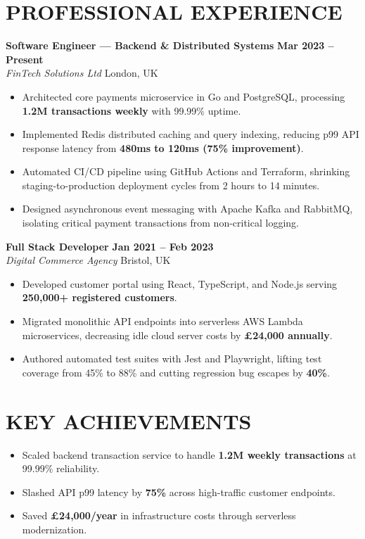 \documentclass[11pt,a4paper]{article}
\begin{document}
\section*{PROFESSIONAL EXPERIENCE}

\textbf{Software Engineer --- Backend \& Distributed Systems} \hfill \textbf{Mar 2023 -- Present} \\
\textit{FinTech Solutions Ltd} \hfill London, UK
\begin{itemize}
    \item Architected core payments microservice in Go and PostgreSQL, processing \textbf{1.2M transactions weekly} with 99.99\% uptime.
    \item Implemented Redis distributed caching and query indexing, reducing p99 API response latency from \textbf{480ms to 120ms (75\% improvement)}.
    \item Automated CI/CD pipeline using GitHub Actions and Terraform, shrinking staging-to-production deployment cycles from 2 hours to 14 minutes.
    \item Designed asynchronous event messaging with Apache Kafka and RabbitMQ, isolating critical payment transactions from non-critical logging.
\end{itemize}
\vspace{8pt}

\textbf{Full Stack Developer} \hfill \textbf{Jan 2021 -- Feb 2023} \\
\textit{Digital Commerce Agency} \hfill Bristol, UK
\begin{itemize}
    \item Developed customer portal using React, TypeScript, and Node.js serving \textbf{250,000+ registered customers}.
    \item Migrated monolithic API endpoints into serverless AWS Lambda microservices, decreasing idle cloud server costs by \textbf{\pounds24,000 annually}.
    \item Authored automated test suites with Jest and Playwright, lifting test coverage from 45\% to 88\% and cutting regression bug escapes by \textbf{40\%}.
\end{itemize}

\section*{KEY ACHIEVEMENTS}
\begin{itemize}
    \item Scaled backend transaction service to handle \textbf{1.2M weekly transactions} at 99.99\% reliability.
    \item Slashed API p99 latency by \textbf{75\%} across high-traffic customer endpoints.
    \item Saved \textbf{\pounds24,000/year} in infrastructure costs through serverless modernization.
\end{itemize}
\end{document}
